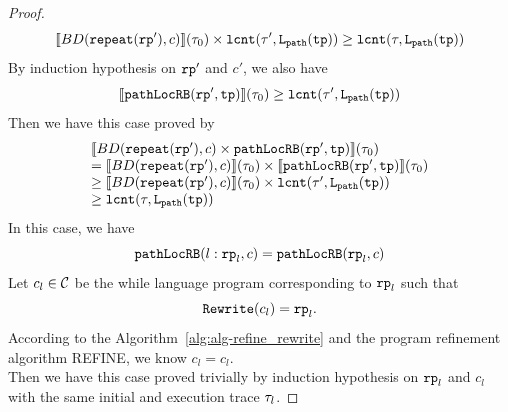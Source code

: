 \begin{proof}
\[
  \llbracket BD(\mathtt{repeat}(\mathtt{rp}'), c) \rrbracket(\mathtt{\tau}_0) \times \mathtt{lcnt}(\mathtt{\tau}', \mathtt{L}_{\mathtt{path}}(\mathtt{tp}))  
  \geq \mathtt{lcnt}(\mathtt{\tau}, \mathtt{L}_{\mathtt{path}}(\mathtt{tp})) 
\]
By induction hypothesis on $\mathtt{rp}'$ and $c'$, we also have
\[
  \llbracket \mathtt{pathLocRB}(\mathtt{rp}', \mathtt{tp}) \rrbracket(\mathtt{\tau}_0) \geq \mathtt{lcnt}(\mathtt{\tau}',  \mathtt{L}_{\mathtt{path}}(\mathtt{tp})) 
\]
Then we have this case proved by
\[
  \begin{array}{l}
  \llbracket BD(\mathtt{repeat}(\mathtt{rp}'), c) \times \mathtt{pathLocRB}(\mathtt{rp}', \mathtt{tp}) \rrbracket(\mathtt{\tau}_0) 
  \\
  =
  \llbracket BD(\mathtt{repeat}(\mathtt{rp}'), c) \rrbracket(\mathtt{\tau}_0) \times \llbracket \mathtt{pathLocRB}(\mathtt{rp}', \mathtt{tp}) \rrbracket(\mathtt{\tau}_0) 
  \\
  \geq \llbracket BD(\mathtt{repeat}(\mathtt{rp}'), c) \rrbracket(\mathtt{\tau}_0) \times \mathtt{lcnt}(\mathtt{\tau}',  \mathtt{L}_{\mathtt{path}}(\mathtt{tp}))  
  \\
  \geq \mathtt{lcnt}(\mathtt{\tau}, \mathtt{L}_{\mathtt{path}}(\mathtt{tp})) 
  \end{array}
  \]
  In this case, we have
  \[
    \mathtt{pathLocRB}(l: \mathtt{rp}_l, c) = \mathtt{pathLocRB}(\mathtt{rp}_l, c)
  \]
  Let $c_l \in \mathcal{C}$ be the while language program corresponding to $\mathtt{rp}_l$ such that 
  $$\mathtt{Rewrite}(c_l) = \mathtt{rp}_l.$$
  According to the Algorithm~\ref{alg:alg-refine_rewrite} and the program refinement algorithm REFINE, we know
  $c_l = c_l$.
  \\
  Then we have this case proved trivially by induction hypothesis on $\mathtt{rp}_l$ and $c_l$ with the same initial and execution trace $\mathtt{\tau}_l$.


\end{proof}
